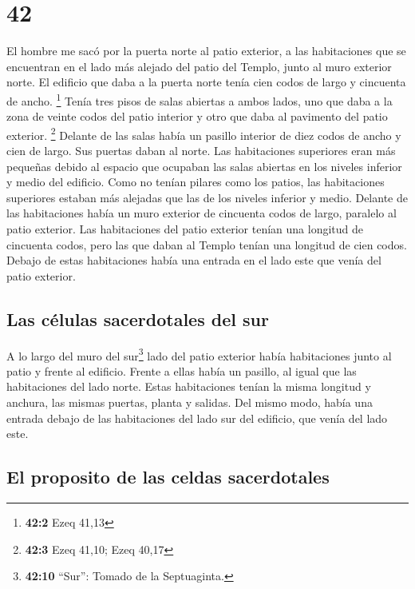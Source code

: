 \hypertarget{section-41}{%
\section{42}\label{section-41}}

 El hombre me sacó por la puerta norte al patio exterior,
a las habitaciones que se encuentran en el lado más alejado del patio
del Templo, junto al muro exterior norte.  El edificio que
daba a la puerta norte tenía cien codos de largo y cincuenta de ancho.
\footnote{\textbf{42:2} Ezeq 41,13}  Tenía tres pisos de
salas abiertas a ambos lados, uno que daba a la zona de veinte codos del
patio interior y otro que daba al pavimento del patio exterior.
\footnote{\textbf{42:3} Ezeq 41,10; Ezeq 40,17}  Delante
de las salas había un pasillo interior de diez codos de ancho y cien de
largo. Sus puertas daban al norte.  Las habitaciones
superiores eran más pequeñas debido al espacio que ocupaban las salas
abiertas en los niveles inferior y medio del edificio. 
Como no tenían pilares como los patios, las habitaciones superiores
estaban más alejadas que las de los niveles inferior y medio.
 Delante de las habitaciones había un muro exterior de
cincuenta codos de largo, paralelo al patio exterior.  Las
habitaciones del patio exterior tenían una longitud de cincuenta codos,
pero las que daban al Templo tenían una longitud de cien codos.
 Debajo de estas habitaciones había una entrada en el lado
este que venía del patio exterior.

\hypertarget{las-cuxe9lulas-sacerdotales-del-sur}{%
\subsection{Las células sacerdotales del
sur}\label{las-cuxe9lulas-sacerdotales-del-sur}}

 A lo largo del muro del sur\footnote{\textbf{42:10}
  ``Sur'': Tomado de la Septuaginta.} lado del patio exterior había
habitaciones junto al patio y frente al edificio.  Frente
a ellas había un pasillo, al igual que las habitaciones del lado norte.
Estas habitaciones tenían la misma longitud y anchura, las mismas
puertas, planta y salidas.  Del mismo modo, había una
entrada debajo de las habitaciones del lado sur del edificio, que venía
del lado este.

\hypertarget{el-proposito-de-las-celdas-sacerdotales}{%
\subsection{El proposito de las celdas
sacerdotales}\label{el-proposito-de-las-celdas-sacerdotales}}

